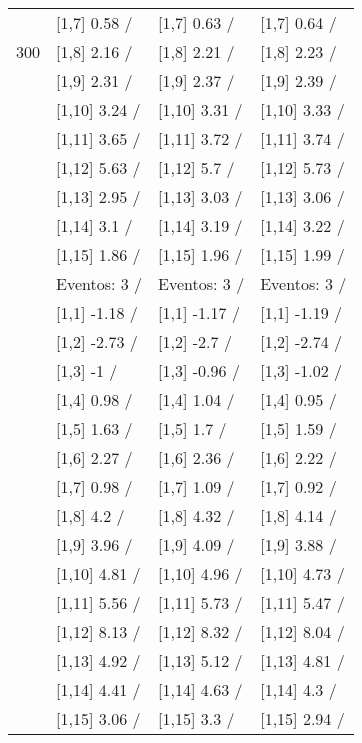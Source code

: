\begin{table}
\begin{tabular}[t]{llll}
 & {}[1,7] 0.58  / & {}[1,7] 0.63  / & {}[1,7] 0.64  /\\
300 & {}[1,8] 2.16  / & {}[1,8] 2.21  / & {}[1,8] 2.23  /\\
\addlinespace
 & {}[1,9] 2.31  / & {}[1,9] 2.37  / & {}[1,9] 2.39  /\\
 & {}[1,10] 3.24  / & {}[1,10] 3.31  / & {}[1,10] 3.33  /\\
 & {}[1,11] 3.65  / & {}[1,11] 3.72  / & {}[1,11] 3.74  /\\
 & {}[1,12] 5.63  / & {}[1,12] 5.7  / & {}[1,12] 5.73  /\\
 & {}[1,13] 2.95  / & {}[1,13] 3.03  / & {}[1,13] 3.06  /\\
\addlinespace
 & {}[1,14] 3.1  / & {}[1,14] 3.19  / & {}[1,14] 3.22  /\\
 & {}[1,15] 1.86  / & {}[1,15] 1.96  / & {}[1,15] 1.99  /\\
 & Eventos:  3 / & Eventos:  3 / & Eventos:  3 /\\
 & {}[1,1] -1.18  / & {}[1,1] -1.17  / & {}[1,1] -1.19  /\\
 & {}[1,2] -2.73  / & {}[1,2] -2.7  / & {}[1,2] -2.74  /\\
\addlinespace
 & {}[1,3] -1  / & {}[1,3] -0.96  / & {}[1,3] -1.02  /\\
 & {}[1,4] 0.98  / & {}[1,4] 1.04  / & {}[1,4] 0.95  /\\
 & {}[1,5] 1.63  / & {}[1,5] 1.7  / & {}[1,5] 1.59  /\\
 & {}[1,6] 2.27  / & {}[1,6] 2.36  / & {}[1,6] 2.22  /\\
 & {}[1,7] 0.98  / & {}[1,7] 1.09  / & {}[1,7] 0.92  /\\
\addlinespace
500 & {}[1,8] 4.2  / & {}[1,8] 4.32  / & {}[1,8] 4.14  /\\
 & {}[1,9] 3.96  / & {}[1,9] 4.09  / & {}[1,9] 3.88  /\\
 & {}[1,10] 4.81  / & {}[1,10] 4.96  / & {}[1,10] 4.73  /\\
 & {}[1,11] 5.56  / & {}[1,11] 5.73  / & {}[1,11] 5.47  /\\
 & {}[1,12] 8.13  / & {}[1,12] 8.32  / & {}[1,12] 8.04  /\\
\addlinespace
 & {}[1,13] 4.92  / & {}[1,13] 5.12  / & {}[1,13] 4.81  /\\
 & {}[1,14] 4.41  / & {}[1,14] 4.63  / & {}[1,14] 4.3  /\\
 & {}[1,15] 3.06  / & {}[1,15] 3.3  / & {}[1,15] 2.94  /\\
\bottomrule
\end{tabular}
\end{table}
